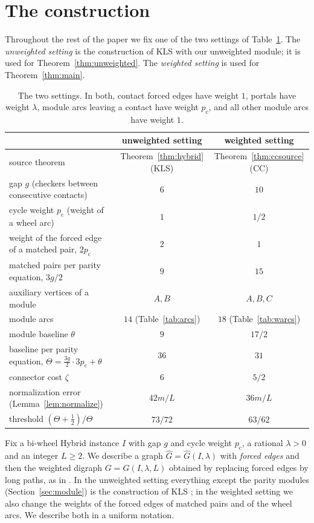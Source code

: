 \documentclass[11pt]{amsart}
\theoremstyle{definition}
\theoremstyle{remark}
\numberwithin{equation}{section}
\newcommand{\pc}{p_{\mathrm{c}}}
\newcommand{\Gh}{\widehat{G}}
\begin{document}
\section{The construction}\label{sec:construction}

Throughout the rest of the paper we fix one of the two settings of Table~\ref{tab:params}. The \emph{unweighted setting} is the construction of KLS with our unweighted module; it is used for Theorem~\ref{thm:unweighted}. The \emph{weighted setting} is used for Theorem~\ref{thm:main}.

\begin{table}[ht]
\centering
\begin{tabular}{@{}lcc@{}}
\toprule
 & unweighted setting & weighted setting\\
\midrule
source theorem & Theorem~\ref{thm:hybrid} (KLS) & Theorem~\ref{thm:ccsource} (CC)\\
gap $g$ (checkers between consecutive contacts) & $6$ & $10$\\
cycle weight $\pc$ (weight of a wheel arc) & $1$ & $1/2$\\
weight of the forced edge of a matched pair, $2\pc$ & $2$ & $1$\\
matched pairs per parity equation, $3g/2$ & $9$ & $15$\\
auxiliary vertices of a module & $A,B$ & $A,B,C$\\
module arcs & $14$ (Table~\ref{tab:arcs}) & $18$ (Table~\ref{tab:warcs})\\
module baseline $\theta$ & $9$ & $17/2$\\
baseline per parity equation, $\Theta=\frac{3g}{2}\cdot3\pc+\theta$ & $36$ & $31$\\
connector cost $\zeta$ & $6$ & $5/2$\\
normalization error (Lemma~\ref{lem:normalize}) & $42m/L$ & $36m/L$\\
threshold $(\Theta+\frac12)/\Theta$ & $73/72$ & $63/62$\\
\bottomrule
\end{tabular}
\medskip
\caption{The two settings. In both, contact forced edges have weight $1$, portals have weight $\lambda$, module arcs leaving a contact have weight $\pc$, and all other module arcs have weight $1$.}
\label{tab:params}
\end{table}

Fix a bi-wheel Hybrid instance $I$ with gap $g$ and cycle weight $\pc$, a rational $\lambda>0$ and an integer $L\ge2$. We describe a graph $\Gh=\Gh(I,\lambda)$ with \emph{forced edges} and then the weighted digraph $G=G(I,\lambda,L)$ obtained by replacing forced edges by long paths, as in \cite{Lam12,KLS15}. In the unweighted setting everything except the parity modules (Section~\ref{sec:module}) is the construction of KLS \cite[\S6.1]{KLS15}; in the weighted setting we also change the weights of the forced edges of matched pairs and of the wheel arcs. We describe both in a uniform notation.
\end{document}
